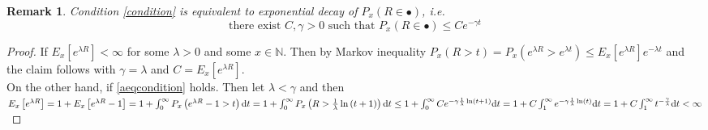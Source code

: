 \documentclass[12pt,a4paper]{scrartcl}
\newtheorem {remark}[theorem]{Remark}
\numberwithin{equation}{section}
\newcommand{\N}{\mathbb{N}} %
\begin{document}
\begin{remark}
\label{tailofR}
Condition \eqref{condition} is equivalent to exponential decay of $ P_{x} \left(R \in \bullet \right) $, i.e.
\begin{equation}
\text{there exist $C,\gamma > 0$ such that  } P_{x} \left(R \in \bullet \right) \leq C e^{-\gamma t}
\label{aeqcondition}
\end{equation}
\end{remark}
\begin{proof}
If $E_{x}\left[ e^{\lambda R} \right] < \infty$ for some $\lambda >0$ and some $ x \in \N$. Then by Markov inequality $P_{x} \left( R > t\right) = P_{x} \left(e^{\lambda R} > e^{\lambda t} \right) \leq E_{x}\left[e^{\lambda R} \right] e^{-\lambda t}$ and the claim follows with $\gamma = \lambda$ and $ C = E_{x} \left[e^{\lambda R}\right]$.\\
On the other hand, if \eqref{aeqcondition} holds. Then let $ \lambda < \gamma $ and then $E_{x}\left[ e^{\lambda R} \right] = 1 + E_{x}\left[ e^{\lambda R} -1 \right] = 1 + \int_{0}^{\infty} P_{x}\left(e^{\lambda R} - 1 > t\right) \textnormal{d}t = 1+\int_{0}^{\infty} P_{x}\left( R > \frac{1}{\lambda} \ln\left(t+1\right)\right) \textnormal{d}t \leq 1+ \int_{0}^{\infty} C e^{-\gamma \frac{1}{\lambda} \ln\left(t+1\right)} \textnormal{d}t = 1+ C \int_{1}^{\infty} e^{-\gamma \frac{1}{\lambda} \ln\left(t\right)} \textnormal{d}t = 1 + C \int_{1}^{\infty} t^{-\frac{\gamma}{\lambda}} \textnormal{d}t < \infty $
\end{proof}
\end{document}
